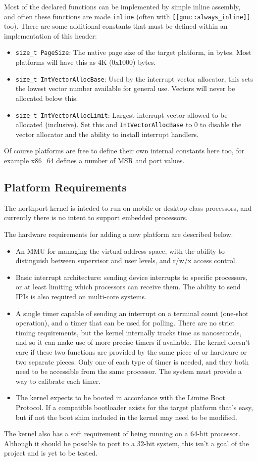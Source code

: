 Most of the declared functions can be implemented by simple inline assembly, and often these functions are made \verb|inline| (often with \verb|[[gnu::always_inline]]| too). There are some additional constants that must be defined within an implementation of this header:

\begin{itemize}
    \item \verb|size_t PageSize|: The native page size of the target platform, in bytes. Most platforms will have this as 4K (0x1000) bytes.
    \item \verb|size_t IntVectorAllocBase|: Used by the interrupt vector allocator, this sets the lowest vector number available for general use. Vectors will never be allocated below this.
    \item \verb|size_t IntVectorAllocLimit|: Largest interrupt vector allowed to be allocated (inclusive). Set this and \verb|IntVectorAllocBase| to 0 to disable the vector allocator and the ability to install interrupt handlers.
\end{itemize}

Of course platforms are free to define their own internal constants here too, for example x86\_64 defines a number of MSR and port values.

\subsection{Platform Requirements}
The northport kernel is inteded to run on mobile or desktop class processors, and currently there is no intent to support embedded processors.

The hardware requirements for adding a new platform are described below.

\begin{itemize}
    \item An MMU for managing the virtual address space, with the ability to distinguish between supervisor and user levels, and r/w/x access control.
    \item Basic interrupt architecture: sending device interrupts to specific processors, or at least limiting which processors can receive them. The ability to send IPIs is also required on multi-core systems.
    \item A single timer capable of sending an interrupt on a terminal count (one-shot operation), and a timer that can be used for polling. There are no strict timing requirements, but the kernel internally tracks time as nanoseconds, and so it can make use of more precise timers if available. The kernel doesn't care if these two functions are provided by the same piece of or hardware or two separate pieces. Only one of each type of timer is needed, and they both need to be accessible from the same processor. The system must provide a way to calibrate each timer.
    \item The kernel expects to be booted in accordance with the Limine Boot Protocol. If a compatible bootloader exists for the target platform that's easy, but if not the boot shim included in the kernel may need to be modified.
\end{itemize}

The kernel also has a soft requirement of being running on a 64-bit processor. Although it should be possible to port to a 32-bit system, this isn't a goal of the project and is yet to be tested.

